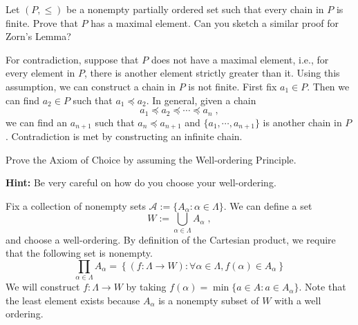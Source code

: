 \documentclass[../main.tex]{subfiles}
\begin{document}
\begin{problem}[5]
    Let $(P, \le)$ be a nonempty partially ordered set such that every chain in $P$ is finite.
    Prove that $P$ has a maximal element.
    Can you sketch a similar proof for Zorn's Lemma?
\end{problem}
For contradiction, suppose that $P$ does not have a maximal element, i.e., for every element in $P$, there is another element strictly greater than it.
Using this assumption, we can construct a chain in $P$ is not finite.
First fix $a_1 \in P$.
Then we can find $a_2 \in P$ such that $a_1 \preceq a_2$.
In general, given a chain
\[
    a_1 \preceq a_2 \preceq \cdots \preceq a_n \; ,
\]
we can find an $a_{n + 1}$ such that $a_n \preceq a_{n + 1}$ and $\{ a_1, \cdots ,a_{n + 1} \}$ is another chain in $P$.
Contradiction is met by constructing an infinite chain.

\begin{problem}[6]
    Prove the Axiom of Choice by assuming the Well-ordering Principle.

    \textbf{Hint:} Be very careful on how do you choose your well-ordering.
\end{problem}
Fix a collection of nonempty sets $\mathcal{A} := \{ A_\alpha : \alpha \in \Lambda \}$.
We can define a set
\[
    W := \bigcup_{\alpha \in \Lambda} A_\alpha \; ,
\]
and choose a well-ordering.
By definition of the Cartesian product, we require that the following set is nonempty.
\[
    \prod_{\alpha \in \Lambda} A_\alpha = \left\{ \left( f : \Lambda \to W \right) : \forall \alpha \in \Lambda, f(\alpha) \in A_\alpha \right\}
\]
We will construct $f : \Lambda \to W $ by taking $f(\alpha) = \min\{ a \in A : a \in A_\alpha \}$.
Note that the least element exists because $A_\alpha$ is a nonempty subset of $W$ with a well ordering.
\end{document}
